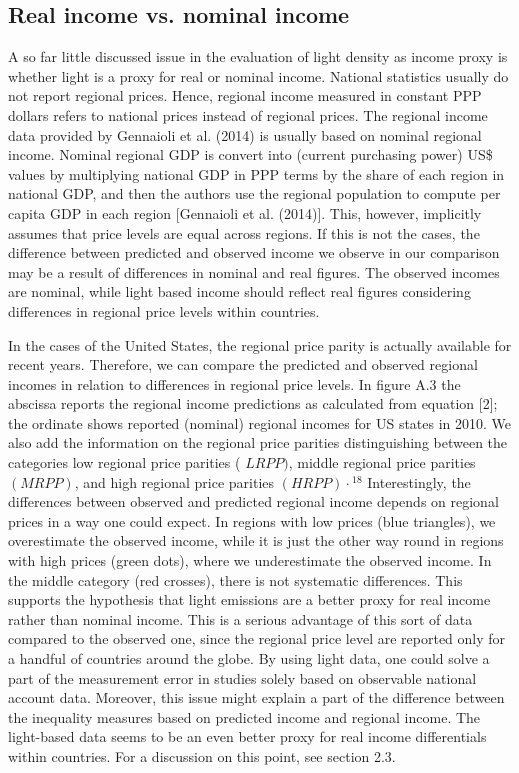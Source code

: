 \documentclass[10pt]{article}
\begin{document}
\subsection*{Real income vs. nominal income}
A so far little discussed issue in the evaluation of light density as income proxy is whether light is a proxy for real or nominal income. National statistics usually do not report regional prices. Hence, regional income measured in constant PPP dollars refers to national prices instead of regional prices. The regional income data provided by Gennaioli et al. (2014) is usually based on nominal regional income. Nominal regional GDP is convert into (current purchasing power) US\$ values by multiplying national GDP in PPP terms by the share of each region in national GDP, and then the authors use the regional population to compute per capita GDP in each region [Gennaioli et al. (2014)]. This, however, implicitly assumes that price levels are equal across regions. If this is not the cases, the difference between predicted and observed income we observe in our comparison may be a result of differences in nominal and real figures. The observed incomes are nominal, while light based income should reflect real figures considering differences in regional price levels within countries.

In the cases of the United States, the regional price parity is actually available for recent years. Therefore, we can compare the predicted and observed regional incomes in relation to differences in regional price levels. In figure A.3 the abscissa reports the regional income predictions as calculated from equation [2]; the ordinate shows reported (nominal) regional incomes for US states in 2010. We also add the information on the regional price parities distinguishing between the categories low regional price parities ( $L R P P)$, middle regional price parities $(M R P P)$, and high regional price parities $(H R P P) \cdot{ }^{18}$ Interestingly, the differences between observed and predicted regional income depends on regional prices in a way one could expect. In regions with low prices (blue triangles), we overestimate the observed income, while it is just the other way round in regions with high prices (green dots), where we underestimate the observed income. In the middle category (red crosses), there is not systematic differences. This supports the hypothesis that light emissions are a better proxy for real income rather than nominal income. This is a serious advantage of this sort of data compared to the observed one, since the regional price level are reported only for a handful of countries around the globe. By using light data, one could solve a part of the measurement error in studies solely based on observable national account data. Moreover, this issue might explain a part of the difference between the inequality measures based on predicted income and regional income. The light-based data seems to be an even better proxy for real income differentials within countries. For a discussion on this point, see section 2.3.
\end{document}

